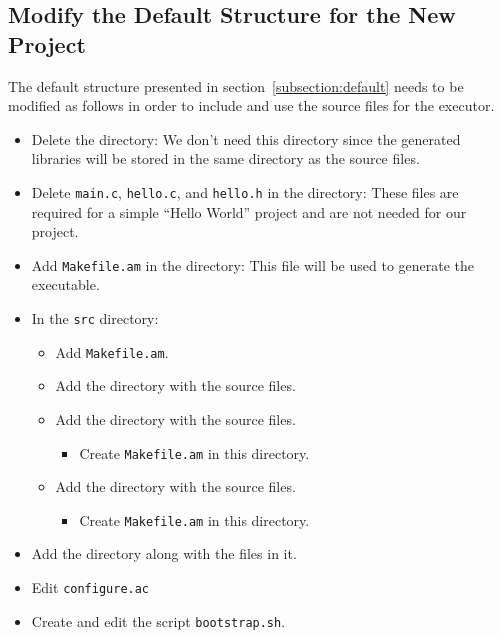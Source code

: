 \subsection{Modify the Default Structure for the New Project}
The default structure presented in section~\ref{subsection:default} needs to be modified as follows in order to include and use the source files for the executor.
\begin{itemize}
  \item Delete the  directory: We don't need this directory since the generated libraries will be stored in the same directory as the source files.
  \item Delete \texttt{main.c}, \texttt{hello.c}, and \texttt{hello.h} in the  directory: These files are required for a simple ``Hello World'' project and are not needed for our project.
  \item Add \texttt{Makefile.am} in the  directory: This file will be used to generate the executable.
  \item In the \texttt{src} directory:
\begin{itemize}
  \item Add \texttt{Makefile.am}.
  \item Add the  directory with the source files.
  \item Add the  directory with the source files.
    \begin{itemize}
      \item Create \texttt{Makefile.am} in this directory.
    \end{itemize}
  \item Add the  directory with the source files.
    \begin{itemize}
      \item Create \texttt{Makefile.am} in this directory.
    \end{itemize}
\end{itemize}
  \item Add the  directory along with the files in it.
\item Edit \texttt{configure.ac}
\item Create and edit the script \texttt{bootstrap.sh}.
\end{itemize}


